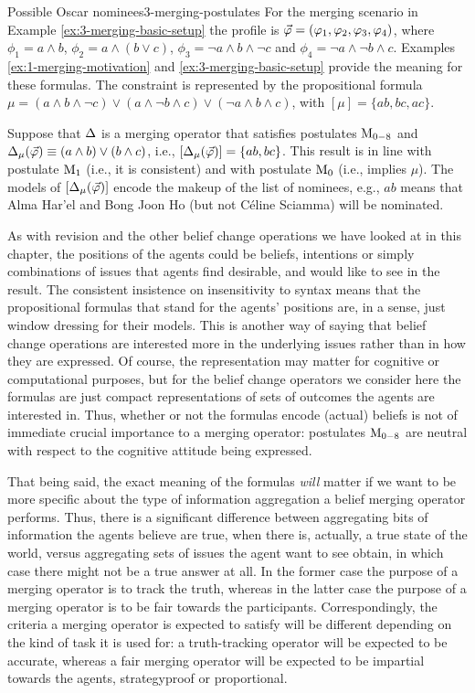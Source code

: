 \begin{xmpl}{Possible Oscar nominees}{3-merging-postulates}
	For the merging scenario in Example \ref{ex:3-merging-basic-setup}
	the profile is $\P=(\phi_1,\phi_2,\phi_3,\phi_4)$,
	where 
	$\phi_1 = a\land b$,
	$\phi_2 = a\land (b\lor c)$,
	$\phi_3 = \lnot a\land b \land \lnot c$
	and
	$\phi_4 = \lnot a \land\lnot b\land c$.
	Examples \ref{ex:1-merging-motivation} 
	and \ref{ex:3-merging-basic-setup} provide the meaning
	for these formulas.
	The constraint is represented by the propositional formula
	$\mu=(a\land b\land \lnot c)\lor (a\land\lnot b\land c)\lor(\lnot a\land b\land c)$,
	with $[\mu]=\{ab,bc,ac\}$.


	Suppose that $\me$ is a merging operator that satisfies postulates $\ppm{0-8}$
	and $\me_\mu(\P)\equiv (a\land b)\lor(b\land c)$,
	i.e., $[\me_\mu(\P)]=\{ab,bc\}$. This result is in line with 
	postulate $\ppm{1}$ (i.e., it is consistent)
	and	with postulate $\ppm{0}$ (i.e., implies $\mu$).
	The models of $[\me_\mu(\P)]$ encode the makeup of the list of nominees,
	e.g., $ab$ means that Alma Har'el and Bong Joon Ho (but not C\'eline Sciamma) will be nominated.
\end{xmpl}

As with revision and the other belief change operations we 
have looked at in this chapter, 
the positions of the agents could be beliefs, intentions or simply 
combinations of issues that agents find desirable, 
and would like to see in the result.
The consistent insistence on insensitivity to syntax means that 
the propositional formulas that stand for the agents' positions 
are, in a sense, just window dressing for their models.
This is another way of saying that
belief change operations are interested more in the underlying issues 
rather than in how they are expressed.
Of course, the representation may matter for cognitive or computational 
purposes, but for the belief change operators we consider here 
the formulas are just compact representations of sets of outcomes the agents 
are interested in.
Thus, whether or not the formulas encode (actual) beliefs is not of 
immediate crucial importance to a merging operator:
postulates $\ppm{0-8}$ are neutral with respect to the cognitive attitude
being expressed.

That being said, the exact meaning of the formulas \emph{will} matter 
if we want to be more specific about the type of information aggregation a belief merging 
operator performs. Thus, there is a significant difference between aggregating 
bits of information the agents believe are true, when there is, actually,
a true state of the world,
versus aggregating sets of issues the agent want to see obtain,
in which case there might not be a true answer at all.
In the former case the purpose of a merging operator is to track the truth,
whereas in the latter case the purpose of a merging operator is to be fair 
towards the participants.
Correspondingly, the criteria a merging operator is expected to satisfy 
will be different depending on the kind of task it is used for:
a truth-tracking operator will be expected to be accurate, 
whereas a fair merging operator will be expected to be impartial 
towards the agents, strategyproof or proportional.

